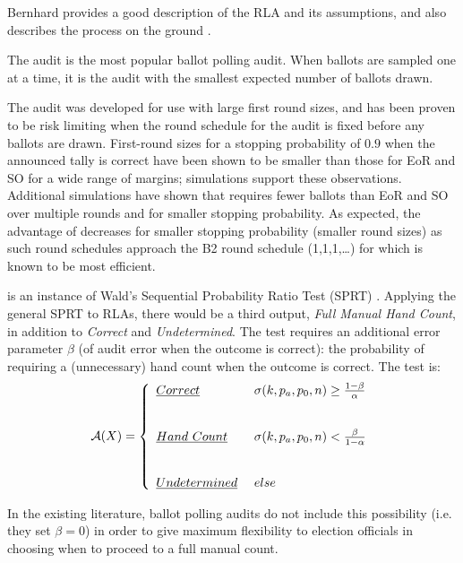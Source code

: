 Bernhard provides a good description of the RLA and its assumptions, and also describes the process on the ground \cite{bernhard-sok}. 

The \BRAVO audit \cite{bravo} is the most popular ballot polling audit. When ballots are sampled one at a time, it is the audit with the smallest expected number of ballots drawn. 

The \Minerva audit \cite{usenix_minerva,arxiv_athena} was developed for use with large first round sizes, and has been proven to be risk limiting when the round schedule for the audit is fixed before any ballots are drawn. First-round sizes for a stopping probability of $0.9$ when the announced tally is correct have been shown to be smaller than those for EoR and SO \BRAVO for a wide range of margins; simulations \cite{arxiv_athena} support these observations. Additional simulations \cite{simulations} have shown that \Minerva requires fewer ballots than EoR and SO \BRAVO over multiple rounds and for smaller stopping probability. As expected, the advantage of \Minerva decreases for smaller stopping probability (smaller round sizes) as such round schedules approach the B2 round schedule (1,1,1,\ldots) for which \BRAVO is known to be most efficient.

\BRAVO is an instance of Wald's Sequential Probability Ratio Test (SPRT) \cite{wald}. Applying the general SPRT to RLAs, there would be a third output, {\em Full Manual Hand Count}, in addition to {\em Correct} and {\em Undetermined}. The test requires an additional error parameter $\beta$ (of audit error when the outcome is correct): the probability of requiring a (unnecessary) hand count when the outcome is correct. The test is:
\begin{equation}
    \mathcal{A}(X) =  \left\{ \begin{array}{ll} \emph{Correct} & ~\sigma(k, p_a, p_0, n) 
        \geq \frac{1-\beta}{\alpha}\\ \\ \\
       \emph{Hand~Count} & ~\sigma(k, p_a, p_0, n) 
        < \frac{\beta}{1-\alpha}\\ \\ \\
        \emph{Undetermined} & ~else 
    \end{array}
    \right .
    \label{eqn:wald}
\end{equation}

In the existing literature, ballot polling audits do not include this possibility (i.e. they set $\beta=0$) in order to give maximum flexibility to election officials in choosing when to proceed to a full manual count.

